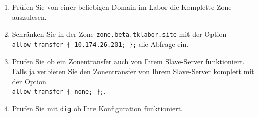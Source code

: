 \begin{enumerate}
  \item Prüfen Sie von einer beliebigen Domain im Labor die Komplette Zone
  auszulesen.
  \item Schränken Sie in der Zone \texttt{zone.beta.tklabor.site} mit der
  Option\\ \texttt{allow-transfer \{ 10.174.26.201; \};} die Abfrage ein.
  \item Prüfen Sie ob ein Zonentransfer auch von Ihrem Slave-Server
  funktioniert. Falls ja verbieten Sie den Zonentransfer von Ihrem Slave-Server
  komplett mit der Option\\ \texttt{allow-transfer \{ none; \};}.
  \item Prüfen Sie mit \texttt{dig} ob Ihre Konfiguration funktioniert.
\end{enumerate}

